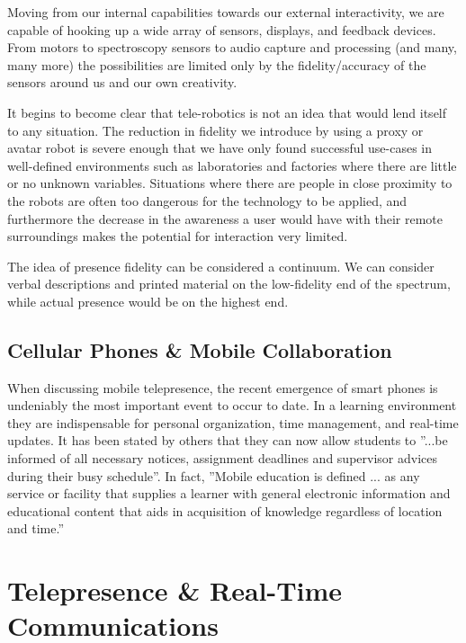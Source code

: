 \documentclass[a4paper,12pt]{report}
\begin{document}
Moving from our internal capabilities towards our external interactivity, we are capable of hooking up a wide array of sensors, displays, and feedback devices. From motors to spectroscopy sensors to audio capture and processing (and many, many more) the possibilities are limited only by the fidelity/accuracy of the sensors around us and our own creativity.

It begins to become clear that tele-robotics is not an idea that would lend itself to any situation. The reduction in fidelity we introduce by using a proxy or avatar robot is severe enough that we have only found successful use-cases in well-defined environments such as laboratories and factories where there are little or no unknown variables. Situations where there are people in close proximity to the robots are often too dangerous for the technology to be applied, and furthermore the decrease in the awareness a user would have with their remote surroundings makes the potential for interaction very limited.

\cite{540147,6104414}

The idea of presence fidelity can be considered a continuum. We can consider verbal descriptions and printed material on the low-fidelity end of the spectrum, while actual presence would be on the highest end. \cite{726589}%

\subsection{Cellular Phones \& Mobile Collaboration} When discussing mobile telepresence, the recent emergence of smart phones is undeniably the most important event to occur to date. In a learning environment they are indispensable for personal organization, time management, and real-time updates. It has been stated by others that they can now allow students to ''...be informed of all necessary notices, assignment deadlines and supervisor advices during their busy schedule''. In fact, ''Mobile education is defined ... as any service or facility that supplies a learner with general electronic information and educational content that aids in acquisition of knowledge regardless of location and time.'' \cite{4469080,6007847}
\fi
\section{Telepresence \& Real-Time Communications}
\end{document}
